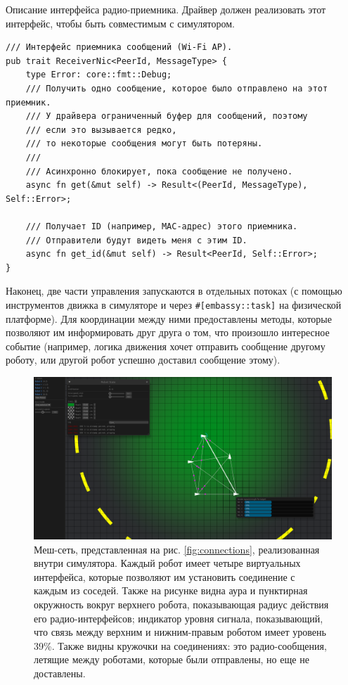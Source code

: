 \documentclass[%
]{report}
\begin{document}
\begin{listing}[H]
  \caption{Описание интерфейса радио-приемника.
  Драйвер должен реализовать этот интерфейс,
  чтобы быть совместимым с симулятором.}
  \label{code:traits2}
  \begin{verbatim}  
/// Интерфейс приемника сообщений (Wi-Fi AP).
pub trait ReceiverNic<PeerId, MessageType> {
    type Error: core::fmt::Debug;
    /// Получить одно сообщение, которое было отправлено на этот приемник.
    /// У драйвера ограниченный буфер для сообщений, поэтому
    /// если это вызывается редко,
    /// то некоторые сообщения могут быть потеряны.
    ///
    /// Асинхронно блокирует, пока сообщение не получено.
    async fn get(&mut self) -> Result<(PeerId, MessageType), Self::Error>;

    /// Получает ID (например, MAC-адрес) этого приемника.
    /// Отправители будут видеть меня с этим ID.
    async fn get_id(&mut self) -> Result<PeerId, Self::Error>;
}
\end{verbatim}
\end{listing}

Наконец, две части управления запускаются в отдельных потоках
(с помощью инструментов движка в симуляторе
и через \texttt{\#[embassy::task]} на физической платформе).
Для координации между ними предоставлены методы,
которые позволяют им информировать друг друга о том, что произошло интересное событие
(например, логика движения хочет
отправить сообщение другому роботу,
или другой робот успешно доставил сообщение этому).

\begin{figure}[p]
  \centering
  \includegraphics[width=\linewidth]{simulator-connections}
	\caption{Меш-сеть, представленная на рис. \ref{fig:connections}, реализованная внутри симулятора. Каждый робот имеет четыре виртуальных интерфейса, которые позволяют им установить соединение с каждым из соседей. Также на рисунке видна аура и пунктирная окружность вокруг верхнего робота, показывающая радиус действия его радио-интерфейсов; индикатор уровня сигнала, показывающий, что связь между верхним и нижним-правым роботом имеет уровень 39\%. Также видны кружочки на соединениях: это радио-сообщения, летящие между роботами, которые были отправлены, но еще не доставлены.}
  \label{fig:simulator-connections}
\end{figure}
\end{document}
